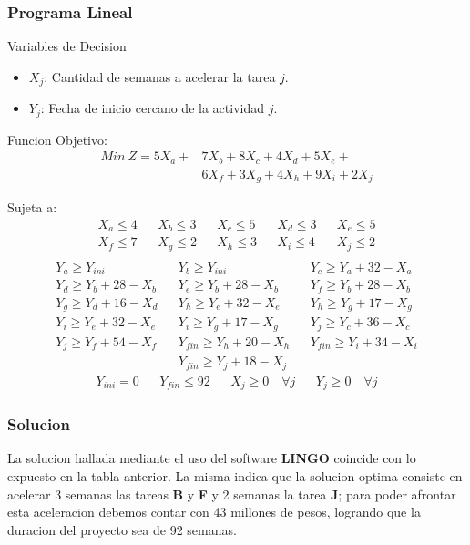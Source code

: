 \begin{homeworkProblem}

\subsubsection{Programa Lineal}
Variables de Decision
\begin{itemize}
    \item $X_j$: Cantidad de semanas a acelerar la tarea $j$.
    \item $Y_j$: Fecha de inicio cercano de la actividad $j$.
\end{itemize}
Funcion Objetivo:
\begin{align*}
    Min\ Z = 5X_a + &7X_b + 8X_c + 4X_d + 5X_e + \\
                    &6X_f + 3X_g + 4X_h + 9X_i + 2X_j
\end{align*}

Sujeta a:
\begin{align*}
    &X_a \leq 4& &X_b \leq 3& &X_c \leq 5& &X_d \leq 3& &X_e \leq 5& \\
    &X_f \leq 7& &X_g \leq 2& &X_h \leq 3& &X_i \leq 4& &X_j\leq 2& \\
\end{align*}
\begin{align*}
   &Y_a \geq Y_{ini}& &Y_b \geq Y_{ini}& &Y_c \geq Y_a + 32 - X_a& \\ 
   &Y_d \geq Y_b + 28 - X_b& &Y_e \geq Y_b + 28 - X_b& &Y_f \geq Y_b + 28 - X_b& \\ 
   &Y_g \geq Y_d + 16 - X_d& &Y_h \geq Y_e + 32 - X_e& &Y_h \geq Y_g + 17 - X_g& \\ 
   &Y_i \geq Y_e + 32 - X_e& &Y_i \geq Y_g+17-X_g& &Y_j \geq Y_c + 36 - X_c&\\
   &Y_j \geq Y_f + 54 - X_f& &Y_{fin} \geq Y_h+20-X_h& &Y_{fin} \geq Y_i+34-X_i&\\
   && &Y_{fin} \geq Y_j+18-X_j& &&
\end{align*}
\begin{align*}
    &Y_{ini}=0& &Y_{fin}\leq92& &X_j\geq0 \quad \forall j& &Y_j\geq 0 \quad \forall j&
\end{align*}

\subsubsection{Solucion}

La solucion hallada mediante el uso del software \textbf{LINGO} coincide con lo expuesto en la tabla anterior. La misma indica que la solucion optima consiste en acelerar 3 semanas las tareas \textbf{B} y \textbf{F} y 2 semanas la tarea \textbf{J}; para poder afrontar esta aceleracion debemos contar con 43 millones de pesos, logrando que la duracion del proyecto sea de 92 semanas.


\end{homeworkProblem}
